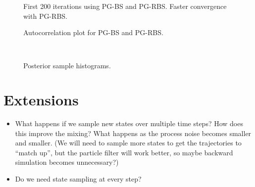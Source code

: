 \documentclass{article}
\begin{document}
\begin{figure}
\centering

\caption{First 200 iterations using PG-BS and PG-RBS. Faster convergence with PG-RBS.}
\label{fig:chain_init}
\end{figure}

\begin{figure}
\centering

\caption{Autocorrelation plot for PG-BS and PG-RBS.}
\label{fig:acf}
\end{figure}

\begin{figure}
\centering
\subfloat[PG-BS (N=100)]{  }
\subfloat[PG-BS (N=200)]{  } \\
\subfloat[PG-RBS (N=100)]{  }
\caption{Posterior sample histograms.}
\label{fig:sample_hist}
\end{figure}


\section{Extensions}
\begin{itemize}
 \item What happens if we sample new states over multiple time steps? How does this improve the mixing? What happens as the process noise becomes smaller and smaller. (We will need to sample more states to get the trajectories to ``match up'', but the particle filter will work better, so maybe backward simulation becomes unnecessary?)
 \item Do we need state sampling at every step?
\end{itemize}
\end{document}
